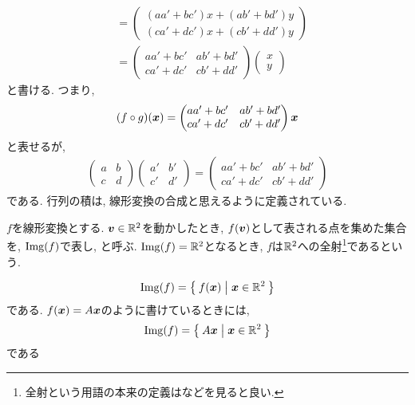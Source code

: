 \begin{remark}
\begin{align*}
    &=\begin{pmatrix}(aa'+bc')x+(ab'+bd')y\\(ca'+dc')x+(cb'+dd')y\end{pmatrix}\\
                &=\begin{pmatrix}aa'+bc'&ab'+bd'\\ca'+dc'&cb'+dd'\end{pmatrix}\begin{pmatrix}x\\y\end{pmatrix}
  \end{align*}
  と書ける.  つまり,
  \begin{align*}
    (f\circ g)(\boldsymbol{x})=\begin{pmatrix}aa'+bc'&ab'+bd'\\ca'+dc'&cb'+dd'\end{pmatrix}\boldsymbol{x}
  \end{align*}
  と表せるが,
  \begin{align*}
    \begin{pmatrix}a&b\\c&d\end{pmatrix}
      \begin{pmatrix}a'&b'\\c'&d'\end{pmatrix}
        =
        \begin{pmatrix}aa'+bc'&ab'+bd'\\ca'+dc'&cb'+dd'\end{pmatrix}
  \end{align*}
  である.
  行列の積は, 線形変換の合成と思えるように定義されている.
\end{remark}


\begin{definition}
  \label{def:img}
  \label{def:suj}
  $f$を線形変換とする.
  $\boldsymbol{v}\in\mathbb{R}^2$を動かしたとき, $f(\boldsymbol{v})$として表される点を集めた集合を,
  $\operatorname{Img}(f)$で表し,
  と呼ぶ.
  $\operatorname{Img}(f)=\mathbb{R}^2$となるとき, $f$は$\mathbb{R}^2$への全射\footnote{全射という用語の本来の定義は\cite[トレーニング26]{978-4-535-78682-0}などを見ると良い.}であるという.
\end{definition}
\begin{remark}
  \begin{align*}
    \operatorname{Img}(f)=\Set{f(\boldsymbol{x})|\boldsymbol{x}\in\mathbb{R}^2}
  \end{align*}
  である.  $f(\boldsymbol{x})=A\boldsymbol{x}$のように書けているときには,
    \begin{align*}
    \operatorname{Img}(f)=\Set{A\boldsymbol{x}|\boldsymbol{x}\in\mathbb{R}^2}
    \end{align*}
    である
\end{remark}

